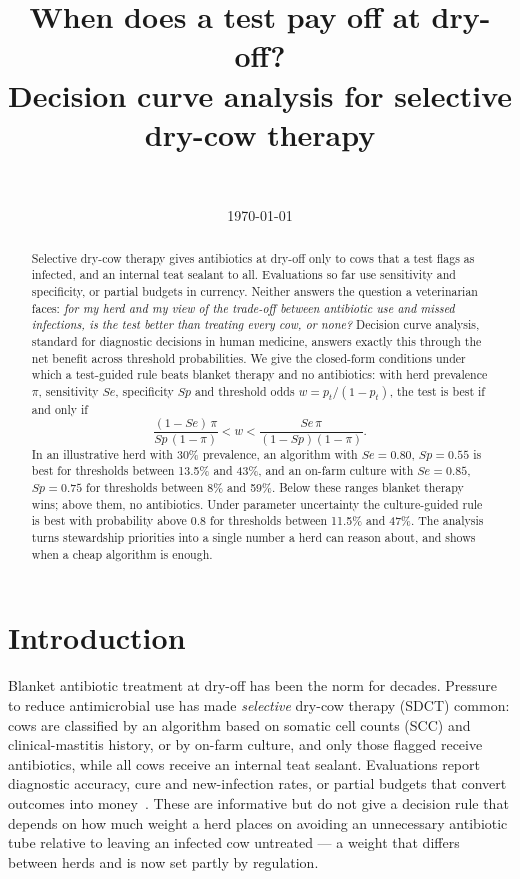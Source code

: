 \documentclass[11pt]{article}
\title{When does a test pay off at dry-off?\\ Decision curve analysis for selective dry-cow therapy}
\author{\authorname\\ \small \affiliation}
\date{\today}
\begin{document}
\maketitle

\begin{abstract}
Selective dry-cow therapy gives antibiotics at dry-off only to cows that a test flags as infected, and an internal
teat sealant to all. Evaluations so far use sensitivity and specificity, or partial budgets in currency. Neither
answers the question a veterinarian faces: \emph{for my herd and my view of the trade-off between antibiotic use and
missed infections, is the test better than treating every cow, or none?} Decision curve analysis, standard for
diagnostic decisions in human medicine, answers exactly this through the net benefit across threshold probabilities.
We give the closed-form conditions under which a test-guided rule beats blanket therapy and no antibiotics: with herd
prevalence $\pi$, sensitivity $Se$, specificity $Sp$ and threshold odds $w=p_t/(1-p_t)$, the test is best if and only if
\[ \frac{(1-Se)\,\pi}{Sp\,(1-\pi)} < w < \frac{Se\,\pi}{(1-Sp)(1-\pi)}. \]
In an illustrative herd with 30\% prevalence, an algorithm with $Se=0.80$, $Sp=0.55$ is best for thresholds between
13.5\% and 43\%, and an on-farm culture with $Se=0.85$, $Sp=0.75$ for thresholds between 8\% and 59\%. Below these
ranges blanket therapy wins; above them, no antibiotics. Under parameter uncertainty the culture-guided rule is best
with probability above 0.8 for thresholds between 11.5\% and 47\%. The analysis turns stewardship priorities into a
single number a herd can reason about, and shows when a cheap algorithm is enough.
\end{abstract}

\section{Introduction}
Blanket antibiotic treatment at dry-off has been the norm for decades. Pressure to reduce antimicrobial use has made
\emph{selective} dry-cow therapy (SDCT) common: cows are classified by an algorithm based on somatic cell counts (SCC)
and clinical-mastitis history, or by on-farm culture, and only those flagged receive antibiotics, while all cows
receive an internal teat sealant. Evaluations report diagnostic accuracy, cure and new-infection rates, or partial
budgets that convert outcomes into money~\cite{Rowe2021}. These are informative but do not give a decision rule that
depends on how much weight a herd places on avoiding an unnecessary antibiotic tube relative to leaving an infected
cow untreated --- a weight that differs between herds and is now set partly by regulation.
\end{document}

